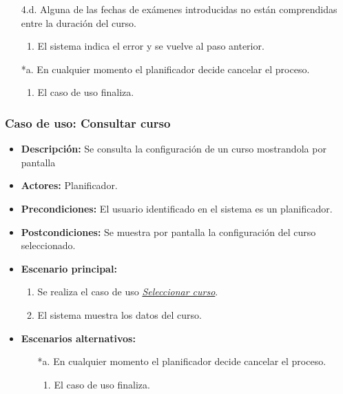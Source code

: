 \begin{itemize}
\begin{itemize}
\begin{enumerate}
    \end{enumerate}
  \item[4.d.] Alguna de las fechas de exámenes introducidas no están comprendidas entre la duración del curso.
    \begin{enumerate}
    \item El sistema indica el error y se vuelve al paso anterior.
    \end{enumerate}
  \item[*a.] En cualquier momento el planificador decide cancelar el proceso.
    \begin{enumerate}
    \item El caso de uso finaliza.
    \end{enumerate}
  \end{itemize}
\end{itemize}



\subsubsection*{Caso de uso: Consultar curso}
\begin{itemize}
\item{\bf Descripción:} Se consulta la configuración de un curso mostrandola por pantalla
\item{\bf Actores:} Planificador.
\item{\bf Precondiciones:} El usuario identificado en el sistema es un planificador.
\item{\bf Postcondiciones:} Se muestra por pantalla la configuración del curso seleccionado.
\item{\bf Escenario principal:}
  \begin{enumerate}
  \item Se realiza el caso de uso {\em \hyperref[select_curso]{Seleccionar curso}}.
  \item El sistema muestra los datos del curso.
  \end{enumerate}
\item{\bf Escenarios alternativos:}
  \begin{itemize}
  \item[*a.] En cualquier momento el planificador decide cancelar el proceso.
    \begin{enumerate}
    \item El caso de uso finaliza.
    \end{enumerate}
  \end{itemize}
\end{itemize}



